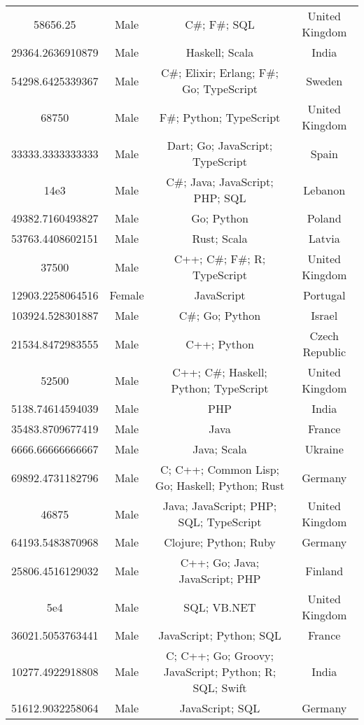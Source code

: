 \begin{center}
\begin{tabular}{ |c|c|c|c| }
58656.25  &  Male  &  C\#; F\#; SQL  &  United Kingdom  \\ 
29364.2636910879  &  Male  &  Haskell; Scala  &  India  \\ 
54298.6425339367  &  Male  &  C\#; Elixir; Erlang; F\#; Go; TypeScript  &  Sweden  \\ 
68750  &  Male  &  F\#; Python; TypeScript  &  United Kingdom  \\ 
33333.3333333333  &  Male  &  Dart; Go; JavaScript; TypeScript  &  Spain  \\ 
14e3  &  Male  &  C\#; Java; JavaScript; PHP; SQL  &  Lebanon  \\ 
49382.7160493827  &  Male  &  Go; Python  &  Poland  \\ 
53763.4408602151  &  Male  &  Rust; Scala  &  Latvia  \\ 
37500  &  Male  &  C++; C\#; F\#; R; TypeScript  &  United Kingdom  \\ 
12903.2258064516  &  Female  &  JavaScript  &  Portugal  \\ 
103924.528301887  &  Male  &  C\#; Go; Python  &  Israel  \\ 
21534.8472983555  &  Male  &  C++; Python  &  Czech Republic  \\ 
52500  &  Male  &  C++; C\#; Haskell; Python; TypeScript  &  United Kingdom  \\ 
5138.74614594039  &  Male  &  PHP  &  India  \\ 
35483.8709677419  &  Male  &  Java  &  France  \\ 
6666.66666666667  &  Male  &  Java; Scala  &  Ukraine  \\ 
69892.4731182796  &  Male  &  C; C++; Common Lisp; Go; Haskell; Python; Rust  &  Germany  \\ 
46875  &  Male  &  Java; JavaScript; PHP; SQL; TypeScript  &  United Kingdom  \\ 
64193.5483870968  &  Male  &  Clojure; Python; Ruby  &  Germany  \\ 
25806.4516129032  &  Male  &  C++; Go; Java; JavaScript; PHP  &  Finland  \\ 
5e4  &  Male  &  SQL; VB.NET  &  United Kingdom  \\ 
36021.5053763441  &  Male  &  JavaScript; Python; SQL  &  France  \\ 
10277.4922918808  &  Male  &  C; C++; Go; Groovy; JavaScript; Python; R; SQL; Swift  &  India  \\ 
51612.9032258064  &  Male  &  JavaScript; SQL  &  Germany  \\ 

\end{tabular}
\end{center}
